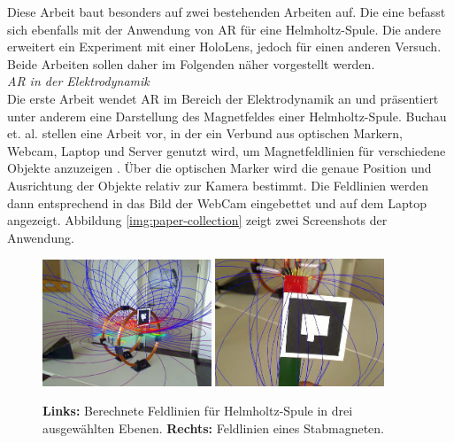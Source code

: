 Diese Arbeit baut besonders auf zwei bestehenden Arbeiten auf. Die eine befasst sich ebenfalls mit der Anwendung von AR für eine Helmholtz-Spule. Die andere erweitert ein Experiment mit einer HoloLens, jedoch für einen anderen Versuch. Beide Arbeiten sollen daher im Folgenden näher vorgestellt werden.\\

\vspace{4px}
\textit{AR in der Elektrodynamik}\\
Die erste Arbeit wendet AR im Bereich der Elektrodynamik an und präsentiert unter anderem eine Darstellung des Magnetfeldes einer Helmholtz-Spule. Buchau et. al. stellen eine Arbeit vor, in der ein Verbund aus optischen Markern, Webcam, Laptop und Server genutzt wird, um Magnetfeldlinien für verschiedene Objekte anzuzeigen \cite{Buchau09}. Über die optischen Marker wird die genaue Position und Ausrichtung der Objekte relativ zur Kamera bestimmt. Die Feldlinien werden dann entsprechend in das Bild der WebCam eingebettet und auf dem Laptop angezeigt. Abbildung \ref{img:paper-collection} zeigt zwei Screenshots der Anwendung.\\

\begin{figure}[h!]
	\centering
	\includegraphics[width=0.45\textwidth]{images/papers/Buchau09.jpg}
	\hspace{0.05cm}
	\includegraphics[width=0.45\textwidth]{images/papers/Buchau09_Magnet_2.jpg}
	\caption{\textbf{Links:} Berechnete Feldlinien für Helmholtz-Spule in drei ausgewählten Ebenen. \textbf{Rechts: } Feldlinien eines Stabmagneten.\cite{Buchau09}}
\end{figure}

